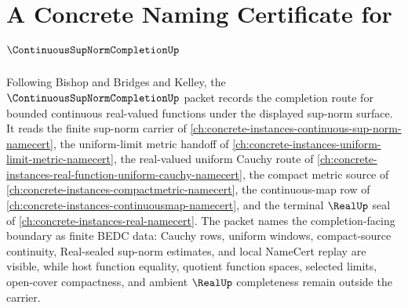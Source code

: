 \chapter{A Concrete Naming Certificate for $\ContinuousSupNormCompletionUp$}
\label{ch:concrete-instances-continuous-supnorm-completion-namecert}

Following Bishop and Bridges and Kelley, the $\ContinuousSupNormCompletionUp$ packet records the completion route for bounded continuous real-valued functions under the displayed sup-norm surface. It reads the finite sup-norm carrier of \autoref{ch:concrete-instances-continuous-sup-norm-namecert}, the uniform-limit metric handoff of \autoref{ch:concrete-instances-uniform-limit-metric-namecert}, the real-valued uniform Cauchy route of \autoref{ch:concrete-instances-real-function-uniform-cauchy-namecert}, the compact metric source of \autoref{ch:concrete-instances-compactmetric-namecert}, the continuous-map row of \autoref{ch:concrete-instances-continuousmap-namecert}, and the terminal $\RealUp$ seal of \autoref{ch:concrete-instances-real-namecert}. The packet names the completion-facing boundary as finite BEDC data: Cauchy rows, uniform windows, compact-source continuity, Real-sealed sup-norm estimates, and local NameCert replay are visible, while host function equality, quotient function spaces, selected limits, open-cover compactness, and ambient $\RealUp$ completeness remain outside the carrier.

